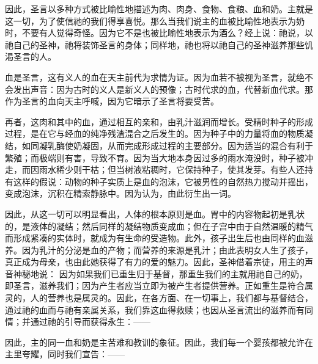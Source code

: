 因此，圣言以多种方式被比喻性地描述为肉、肉身、食物、食粮、血和奶。主就是这一切，为了使信祂的我们得享喜悦。那么当我们说主的血被比喻性地表示为奶时，不要有人觉得奇怪。因为它不是也被比喻性地表示为酒么？经上说：祂说，以祂自己的圣神，祂将装饰圣言的身体；同样地，祂也将以祂自己的圣神滋养那些饥渴圣言的人。\par

血是圣言，这有义人的血在天主前代为求情为证。因为血若不被视为圣言，就绝不会发出声音：因为古时的义人是新义人的预像；古时代求的血，代替新血代求。那作为圣言的血向天主呼喊，因为它暗示了圣言将要受苦。\par

再者，这肉和其中的血，通过相互的亲和，由乳汁滋润而增长。受精时种子的形成过程，是在它与经血的纯净残渣混合之后发生的。因为种子中的力量将血的物质凝结，如同凝乳酶使奶凝固，从而完成形成过程的主要部分。因为适当的混合有利于繁殖；而极端则有害，导致不育。因为当大地本身因过多的雨水淹没时，种子被冲走，而因雨水稀少则干枯；但当树液粘稠时，它保持种子，使其发芽。有些人还持有这样的假说：动物的种子实质上是血的泡沫，它被男性的自然热力搅动并摇出，变成泡沫，沉积在精索静脉中。因为认为，由此衍生出一词。\par

因此，从这一切可以明显看出，人体的根本原则是血。胃中的内容物起初是乳状的，是液体的凝结；然后同样的凝结物质变成血；但在子宫中由于自然温暖的精气而形成紧凑的实体时，就成为有生命的受造物。此外，孩子出生后也由同样的血滋养。因为乳汁的分泌是血的产物；而营养的来源是乳汁；由此表明女人生了孩子，真正成为母亲，也由此她获得了有力的爱的魅力。因此，圣神借着宗徒，用主的声音神秘地说： 因为如果我们已重生归于基督，那重生我们的主就用祂自己的奶，即圣言，滋养我们；因为产生者应当立即为被产生者提供营养。正如重生是符合属灵的，人的营养也是属灵的。因此，在各方面、在一切事上，我们都与基督结合，通过祂的血而与祂有亲属关系，我们靠这血得救赎；也因从圣言流出的滋养而有同情；并通过祂的引导而获得永生：——\par

\par

因此，主的同一血和奶是主苦难和教训的象征。因此，我们每一个婴孩都被允许在主里夸耀，同时我们宣告：——\par

\par

